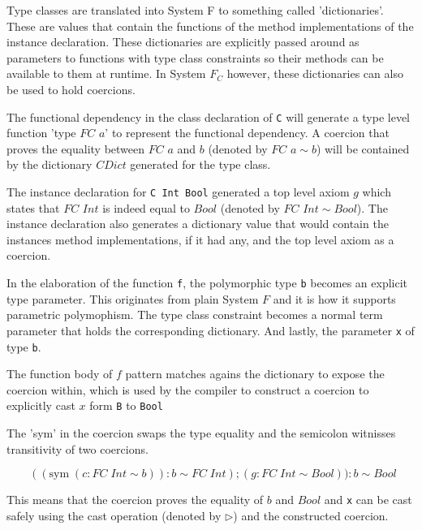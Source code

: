 Type classes are translated into System F to something called 'dictionaries'.
These are values that contain the functions of the method implementations of the
instance declaration. These dictionaries are explicitly passed around as
parameters to functions with type class constraints so their methods can be
available to them at runtime. In System $F_C$ however, these dictionaries can
also be used to hold coercions.

The functional dependency in the class declaration of \texttt{C} will generate a
type level function 'type $FC$ $a$' to represent the functional dependency. A
coercion that proves the equality between $FC$ $a$ and $b$ (denoted by $FC$ $a
\sim b$) will be contained by the dictionary $CDict$ generated for the type
class.

The instance declaration for \texttt{C Int Bool} generated a top level axiom
$g$ which states that $FC$ $Int$ is indeed equal to $Bool$ (denoted by $FC$ $Int
\sim Bool$). The instance declaration also generates a dictionary value that
would contain the instances method implementations, if it had any, and the top
level axiom as a coercion.

In the elaboration of the function \texttt{f}, the polymorphic type \texttt{b}
becomes an explicit type parameter. This originates from plain System $F$ and it
is how it supports parametric polymophism. The type class constraint becomes a
normal term parameter that holds the corresponding dictionary. And lastly, the
parameter \texttt{x} of type \texttt{b}.

The function body of $f$ pattern matches agains the dictionary to expose the
coercion within, which is used by the compiler to construct a coercion to
explicitly cast $x$ form \texttt{B} to \texttt{Bool}

The 'sym' in the coercion swaps the type equality and the semicolon witnisses
transitivity of two coercions.

$\quad\quad((\text{sym} \; (c : FC \; Int \sim b)) : b \sim FC \; Int) ; (g : FC
\; Int \sim Bool) ) : b \sim Bool$

This means that the coercion proves the equality of $b$ and $Bool$ and
\texttt{x} can be cast safely using the cast operation (denoted by
$\triangleright$) and the constructed coercion.
